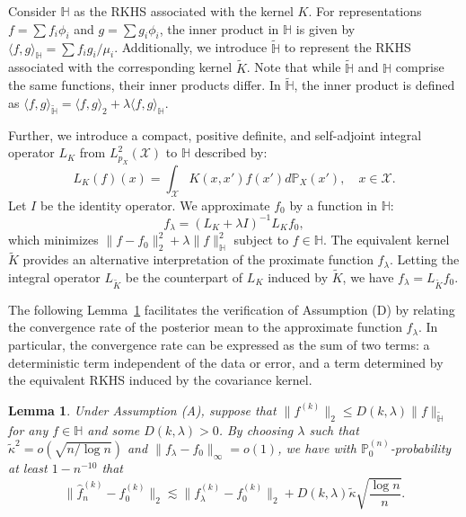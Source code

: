 \documentclass[12pt]{article}
\newcommand{\PP}{\mathbb{P}}
\newcommand{\bbH}{\mathbb{H}}
\newcommand{\mX}{\mathcal{X}}
\newcommand{\Ltwo}{L^2_{p_X}(\mX)}
\theoremstyle{plain}
\newtheorem{lemma}[theorem]{Lemma}
\theoremstyle{nonitalicremark}
\begin{document}
Consider $\mathbb{H}$ as the RKHS associated with the kernel $K$. For representations $f = \sum f_i\phi_i$ and $g = \sum g_i\phi_i$, the inner product in $\mathbb{H}$ is given by $\langle f,g \rangle_{\mathbb{H}} = \sum f_ig_i/\mu_i$. Additionally, we introduce $\tilde{\mathbb{H}}$ to represent the RKHS associated with the corresponding kernel $\tilde{K}$. Note that while $\tilde{\mathbb{H}}$ and $\mathbb{H}$ comprise the same functions, their inner products differ. In $\tilde{\mathbb{H}}$, the inner product is defined as $\langle f,g \rangle_{\tilde{\mathbb{H}}} = \langle f,g \rangle_2 + \lambda\langle f,g \rangle_\mathbb{H}$. 

Further, we introduce a compact, positive definite, and self-adjoint integral operator $L_K$ from $\Ltwo$ to $\mathbb{H}$ described by:
\begin{equation} \label{eq:int.operator}
L_K(f)(x) = \int_{\mX} K(x, x') f(x') d\PP_X(x'), \quad x \in \mX. 
\end{equation}
Let $I$ be the identity operator. We approximate $f_0$ by a function in $\bbH$:
\begin{equation}\label{eq:flambda}
f_{\lambda} = (L_K + \lambda I)^{-1}L_K f_{0},
\end{equation}
which minimizes $ \|f - f_{0}\|_{2}^2 + \lambda \|f\|^2_{\bbH}$ subject to $f \in \bbH$. The equivalent kernel $\tilde{K}$ provides an alternative interpretation of the proximate function $f_\lambda$. Letting the integral operator $L_{\tilde{K}}$ be the counterpart of $L_K$ induced by $\tilde{K}$, we have $f_\lambda = L_{\tilde{K}}f_0$. 

The following Lemma~\ref{lem:approx.error} facilitates the verification of  Assumption (D) by relating the convergence rate of the posterior mean to the approximate function $f_\lambda$. In particular, the convergence rate can be expressed as the sum of two terms: a deterministic term independent of the data or error, and a term determined by the equivalent RKHS induced by the covariance kernel.

\begin{lemma}\label{lem:approx.error}
Under Assumption (A), suppose that $\|f^{(k)}\|_2\leq D(k,\lambda) \|f\|_{\tilde{\bbH}}$ for any $f\in\bbH$ and some $D(k,\lambda) > 0$. By choosing $\lambda$ such that $\tilde{\kappa}^2=o(\sqrt{n/\log n})$ and $\|f_\lambda - f_0\|_\infty = o(1)$, we have with $\PP_0^{(n)}$-probability at least $1-n^{-10}$ that
\begin{equation}
\|\hat{f}_n^{(k)}-f_0^{(k)}\|_2 \lesssim\|f_\lambda^{(k)}-f_0^{(k)}\|_2 + D(k,\lambda) \tilde\kappa \sqrt{\frac{\log n}{n}}.
\end{equation}
\end{lemma}
\end{document}
